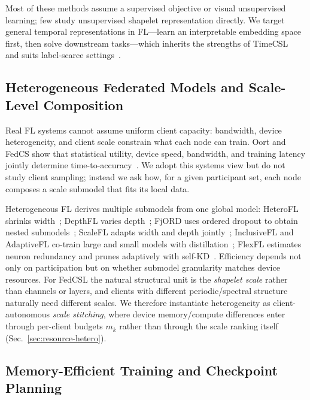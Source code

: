 \documentclass[sigconf]{acmart}
\begin{document}
Most of these methods assume a supervised objective or visual unsupervised
learning; few study unsupervised shapelet representation directly. We target
general temporal representations in FL---learn an interpretable embedding space
first, then solve downstream tasks---which inherits the strengths of
TimeCSL~\cite{timescsl} and suits label-scarce settings~\cite{fedsmall}.

\subsection{Heterogeneous Federated Models and Scale-Level Composition}

Real FL systems cannot assume uniform client capacity: bandwidth, device
heterogeneity, and client scale constrain what each node can train. Oort and
FedCS show that statistical utility, device speed, bandwidth, and training
latency jointly determine time-to-accuracy~\cite{oort,fedcsadaptive}. We adopt
this systems view but do not study client sampling; instead we ask how, for a
given participant set, each node composes a scale submodel that fits its local
data.

Heterogeneous FL derives multiple submodels from one global model: HeteroFL
shrinks width~\cite{heterofl}; DepthFL varies depth~\cite{depthfl}; FjORD uses
ordered dropout to obtain nested submodels~\cite{fjord}; ScaleFL adapts width and
depth jointly~\cite{scalefl}; InclusiveFL and AdaptiveFL co-train large and small
models with distillation~\cite{inclusivefl,adaptivefl}; FlexFL estimates neuron
redundancy and prunes adaptively with self-KD~\cite{flexfl}. Efficiency depends
not only on participation but on whether submodel granularity matches device
resources. For FedCSL the natural structural unit is the \emph{shapelet scale}
rather than channels or layers, and clients with different periodic/spectral
structure naturally need different scales. We therefore instantiate heterogeneity
as client-autonomous \emph{scale stitching}, where device memory/compute
differences enter through per-client budgets $m_k$ rather than through the scale
ranking itself (Sec.~\ref{sec:resource-hetero}).

\subsection{Memory-Efficient Training and Checkpoint Planning}
\end{document}
